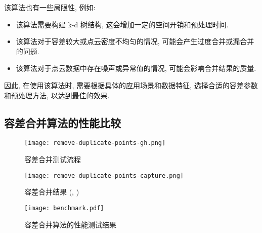 该算法也有一些局限性, 例如:
\begin{itemize}
  \item 该算法需要构建 k-d 树结构, 这会增加一定的空间开销和预处理时间.
  \item 该算法对于容差较大或点云密度不均匀的情况, 可能会产生过度合并或漏合并的问题.
  \item 该算法对于点云数据中存在噪声或异常值的情况, 可能会影响合并结果的质量.
\end{itemize}

因此, 在使用该算法时, 需要根据具体的应用场景和数据特征, 选择合适的容差参数和预处理方法, 以达到最佳的效果.

\subsection{容差合并算法的性能比较}

\begin{figure}[htbp]
  \centering
  \texttt{[image: remove-duplicate-points-gh.png]}
  \caption{容差合并测试流程}
  \label{fig:benchmark-gh}
\end{figure}

\begin{figure}[htbp]
  \centering
  \texttt{[image: remove-duplicate-points-capture.png]}
  \caption{容差合并结果 (, )}
  \label{fig:benchmark-result}
\end{figure}

\begin{figure}[htbp]
  \centering
  \texttt{[image: benchmark.pdf]}
  \caption{容差合并算法的性能测试结果}
  \label{fig:benchmark}
\end{figure}

